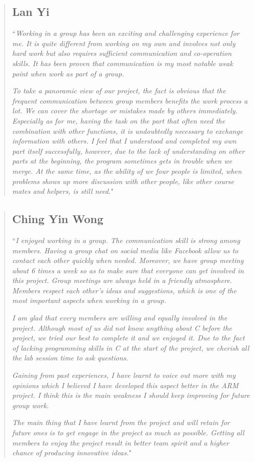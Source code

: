 \documentclass[11pt]{article}
\begin{document}
\begin{quote}
\subsection*{Lan Yi}
``\textit{Working in a group has been an exciting and challenging experience
for me. It is quite different from working on my own and involves not only
 hard work but also requires sufficient communication and co-operation skills.
 It has been proven that communication is my most notable weak point when work
  as part of a group.}

\textit{To take a panoramic view of our project, the fact is obvious that the
frequent communication between group members benefits the work process a lot.
 We can cover the shortage or mistakes made by others immediately. Especially
 as for me, having the task on the part that often need the combination with
 other functions, it is undoubtedly necessary to exchange information with
 others. I feel that I understood and completed my own part itself successfully,
  however, due to the lack of understanding on other parts at the beginning,
  the program sometimes gets in trouble when we merge. At the same time, as
   the ability of we four people is limited, when problems shows up more
   discussion with other people, like other course mates and helpers, is
   still need.}"
\end{quote}

\begin{quote}
\subsection*{Ching Yin Wong}
``\textit{I enjoyed working in a group. The communication skill is strong among
 members. Having a group chat on social media like Facebook allow us to contact
  each other quickly when needed. Moreover, we have group meeting about 6 times
   a week so as to make sure that everyone can get involved in this project.
    Group meetings are always held in a friendly atmosphere. Members respect
     each other’s ideas and suggestions, which is one of the most important
     aspects when working in a group.}

\textit{I am glad that every members are willing and equally involved in the
 project. Although most of us did not know anything about C before the project,
  we tried our best to complete it and we enjoyed it. Due to the fact of
  lacking programming skills in C at the start of the project, we cherish
  all the lab session time to ask questions. }

\textit{Gaining from past experiences, I have learnt to voice out more with my
 opinions which I believed I have developed this aspect better in the ARM
 project. I think this is the main weakness I should keep improving for
  future group work.}

\textit{The main thing that I have learnt from the project and will retain for
 future ones is to get engage in the project as much as possible. Getting all
 members to enjoy the project result in better team spirit and a higher chance
 of producing innovative ideas.}"
\end{quote}
\end{document}
